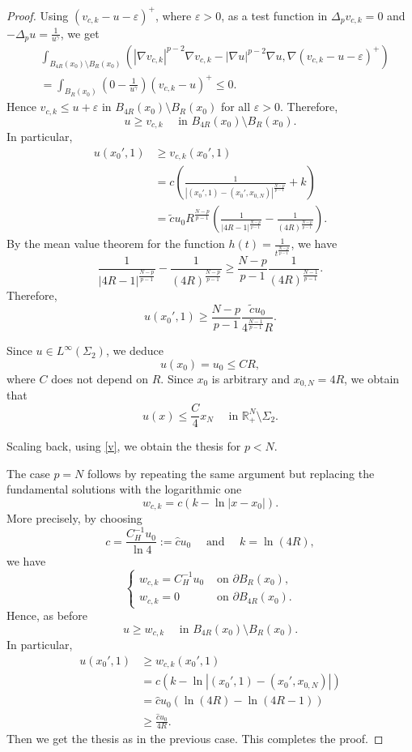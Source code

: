 \documentclass[reqno]{amsart}
\theoremstyle{plain}
\theoremstyle{definition}
\theoremstyle{remark}
\begin{document}
\begin{proof}
		Using $(v_{c,k}-u-\varepsilon)^+$, where $\varepsilon>0$, as a test function in $\Delta_p v_{c,k} = 0$ and $-\Delta_p u = \frac{1}{u^\gamma}$, we get
		\begin{align*}
			&\int_{B_{4R}(x_0) \setminus B_R(x_0)} (|\nabla v_{c,k}|^{p-2}\nabla v_{c,k} - |\nabla u|^{p-2}\nabla u, \nabla (v_{c,k}-u-\varepsilon)^+) \\
			&= \int_{B_R(x_0)} \left(0 - \frac{1}{u^\gamma}\right) (v_{c,k}-u)^+ \le 0.
		\end{align*}
		Hence $v_{c,k} \le u+\varepsilon$ in $B_{4R}(x_0) \setminus B_R(x_0)$ for all $\varepsilon>0$. Therefore,
		\[
		u \ge v_{c,k} \quad \text{ in } B_{4R}(x_0) \setminus B_R(x_0).
		\]
		In particular,
		\begin{align*}
			u(x_0',1) &\ge v_{c,k}(x_0',1)\\
			&= c\left(\frac{1}{|(x_0',1)-(x_0',x_{0,N})|^\frac{N-p}{p-1}}+k\right)\\
			&= \tilde{c}u_0R^\frac{N-p}{p-1} \left(\frac{1}{|4R-1|^\frac{N-p}{p-1}}-\frac{1}{(4R)^\frac{N-p}{p-1}}\right).
		\end{align*}
		By the mean value theorem for the function $h(t)=\frac{1}{t^\frac{N-p}{p-1}}$, we have
		\[
		\frac{1}{|4R-1|^\frac{N-p}{p-1}}-\frac{1}{(4R)^\frac{N-p}{p-1}} \ge \frac{N-p}{p-1}\frac{1}{(4R)^\frac{N-1}{p-1}}.
		\]
		Therefore,
		\[
		u(x_0',1) \ge \frac{N-p}{p-1} \frac{ \tilde{c}u_0}{4^\frac{N-1}{p-1}R}.
		\]
		
		Since $u \in L^\infty(\Sigma_2)$, we deduce
		\[
		u(x_0) = u_0 \le CR,
		\]
		where $C$ does not depend on $R$. Since $x_0$ is arbitrary and $x_{0,N}=4R$, we obtain that
		\[
		u(x) \le \frac{C}{4} x_N \quad\text{ in } \mathbb{R}^N_+\setminus\Sigma_2.
		\]
		
		Scaling back, using \eqref{v}, we obtain the thesis for $p < N$.
		
		The	case $p = N$ follows by repeating the same argument but replacing the
		fundamental solutions with the logarithmic one	
		\[
		w_{c,k} = c\left(k-\ln|x-x_0|\right).
		\]
		More precisely, by choosing
		\[
		c=\frac{C_H^{-1}u_0}{\ln 4} := \hat{c}u_0 \quad\text{ and }\quad k=\ln(4R),
		\]
		we have
		\[
		\begin{cases}
			w_{c,k} = C_H^{-1} u_0 & \text{ on }  \partial B_R(x_0),\\
			w_{c,k} = 0 & \text{ on }  \partial B_{4R}(x_0).
		\end{cases}
		\]
		Hence, as before
		\[
		u \ge w_{c,k} \quad \text{ in } B_{4R}(x_0) \setminus B_R(x_0).
		\]
		In particular,
		\begin{align*}
			u(x_0',1) &\ge w_{c,k}(x_0',1)\\
			&= c\left(k-\ln|(x_0',1)-(x_0',x_{0,N})|\right)\\
			&= \hat{c}u_0\left(\ln(4R)-\ln(4R-1)\right)\\
			&\ge \frac{\hat{c}u_0}{4R}.
		\end{align*}
		Then we get the thesis as in the previous case.
		This completes the proof.
	\end{proof}
	
\end{document}
